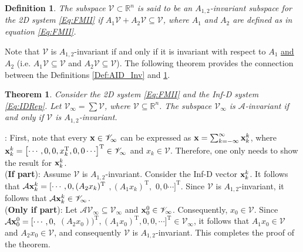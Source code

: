 \documentclass[journal,12pt,draftcls,onecolumn]{IEEEtran}
\newcommand{\tran}{\mathrm{T}}
\newcommand{\bbm}{\begin{bmatrix}}
\newcommand{\ebm}{\end{bmatrix}}
\newcommand{\ssp}[1]{\mathscr{#1}}      \newcommand{\setssp}[1]{\mathfrak{#1}}   \newcommand{\fld}[1]{\mathbb{#1}}       \newcommand{\op}[1]{\mathcal{#1}}       \newcommand{\sumbanach}[1]{\sum{#1}}
\newcommand{\infd}{Inf-D }
\def\QEDclosed{\hfill\IEEEQEDclosed}
\renewcommand{\qed}{\QEDclosed}
\renewenvironment{proof}[1][\proofname]{\noindent\nobreakspace{\bfseries #1}:\;}{\qed\par}
\newtheorem{theorem}{Theorem}
\newtheorem{definition}{Definition}
\begin{document}
\begin{definition}\cite{conte1988GeometryConf}\label{Def:A12_Inv}
	The subspace $\ssp{V}\subset\fld{R}^{n}$  is said to be an {\it $A_{1,2}$-invariant subspace} for the 2D system \eqref{Eq:FMII} if
$A_1\ssp{V} + A_2\ssp{V}\subseteq \ssp{V}$,
where $A_1$ and $A_2$ are defined as in equation \eqref{Eq:FMII}.\qed
\end{definition}
Note that $\ssp{V}$ is $A_{1,2}$-invariant if and only if it is invariant with respect to $A_1$ \underline{and} $A_2$ (i.e. $A_1\ssp{V}\subseteq\ssp{V}$ and $A_2\ssp{V}\subseteq\ssp{V}$).
The following theorem provides the connection between the Definitions \ref{Def:AID_Inv} and \ref{Def:A12_Inv}.
\begin{theorem}\label{Thm:AID_A12Inv}
	Consider the 2D system \eqref{Eq:FMII} and the \infd system \eqref{Eq:IDRep}. Let $\ssp{V}_\infty = \sum \ssp{V}$, where $\ssp{V}\subseteq\fld{R}^n$. The subspace $\ssp{V}_\infty$ is $\op{A}$-invariant if and only if $\ssp{V}$ is $A_{1,2}$-invariant.
\end{theorem}
\begin{proof}
	First, note that every ${\bf x}\in\ssp{V}_\infty$ can be expressed as ${\bf x}=\sum_{k=-\infty}^\infty {\bf x}_k^k$, where ${\bf x}_k^k = \bbm \cdots,0,0,x_k^\tran,0,0\cdots\ebm^\tran\in\ssp{V}_\infty$ and $x_k\in\ssp{V}$. Therefore, one only needs to show the result for ${\bf x}_k^k$.\\
	({\bf If part}): Assume $\ssp{V}$ is $A_{1,2}$-invariant. Consider the Inf-D vector ${\bf x}_k^k$. It follows that $\op{A}{\bf x}_k^k= [\cdots, 0, (A_2x_k)^\tran$ $, (A_1x_k)^\tran,$ $ 0, 0\cdots]^\tran$. Since $\ssp{V}$ is $A_{1,2}$-invariant, it follows that $\op{A}{\bf x}_k^k\in\ssp{V}_\infty$. \\
	({\bf Only if part}): Let $\op{A}\ssp{V}_\infty\subseteq\ssp{V}_\infty$ and ${\bf x}_0^0\in\ssp{V}_\infty$. Consequently, $x_0\in\ssp{V}$. Since $\op{A}{\bf x}_0^0= [ \cdots,0 , $ $ (A_2x_0))^\tran, (A_1x_0)^\tran, 0, 0, \cdots]^\tran\in\ssp{V}_\infty$, it follows that $A_1x_0\in\ssp{V}$ and $A_2x_0\in\ssp{V}$, and consequently $\ssp{V}$ is $A_{1,2}$-invariant. This completes the proof of the theorem.
\end{proof}
\end{document}
